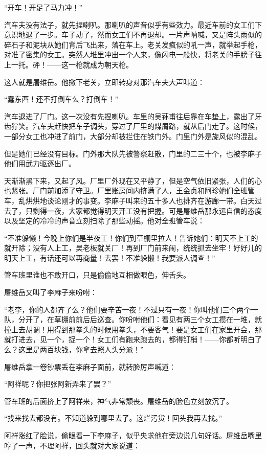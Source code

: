 \par “开车！开足了马力冲！”
\par 汽车夫没有法子，就先捏喇叭。那喇叭的声音似乎有些效力。最近车前的女工们下意识地退了一步。车子动了，然而女工们不再退却。一片声呐喊，又是阵头雨似的碎石子和泥块从她们背后飞出来，落在车上。老关发疯似的吼一声，就举起手枪，对准了密集的女工。突然人堆里冲出一个人来，像闪电一般快，将老关的手膀子往上一托。砰！——这一枪就成为朝天枪。
\par 这人就是屠维岳。他撇下老关，立即转身对那汽车夫大声叫道：
\par “蠢东西！还不打倒车么？打倒车！”
\par 汽车退进了厂门。这一次没有先捏喇叭。车里的吴荪甫往后靠在车垫上，露出了牙齿狞笑。汽车夫赶快把车子调头，穿过了厂里的煤屑路，就从后门走了。这时候，一部分女工也冲进了前门，大部分却被拦住在铁门外。门里门外是旋风似的混乱。
\par 但是她们已经没有目标。门外那大队先被警察赶散，门里的二三十个，也被李麻子他们用武力驱逐出厂。
\par 天渐渐黑下来，又起了风。厂里厂外现在又平静了，但是空气依旧紧张，人们的心也紧张。厂门前加添了守卫。厂里账房间内挤满了人，王金贞和阿珍她们全班管车，乱烘烘地谈论刚才的事变。李麻子叫来的五十多人也排齐在游廊一带。白天过去了，只剩得一夜，大家都觉得明天开工没有把握。可是屠维岳那永远自信的态度以及坚定的冷冷的声音立刻扫除了那些动摇。他对全班管车说：
\par “不准躲懒！今晚上你们是半夜工！你们到草棚里拉人！告诉她们：明天不上工的就开除；没有人上工，吴老板就关厂！再到厂门前来闹，统统抓去坐牢！好好儿的明天上工，有话还可以再商量！去罢！不准躲懒！我要派人调查！”
\par 管车班里谁也不敢开口，只是偷偷地互相做眼色，伸舌头。
\par 屠维岳又叫了李麻子来吩咐：
\par “老李，你的人都齐了么？他们要辛苦一夜！不过只有一夜！你叫他们三个两个一队，分开了，在草棚前前后后巡查。你吩咐他们：看见有两三个女工攒在一堆，就撞上去胡调！用得到那拳头的时候用拳头，不要客气！要是女工们在家里开会，那就打进去，见一个，捉一个！女工们有跑来跑去的，都得钉梢！——你都听明白了么？这里是两百块钱，你拿去照人头分派！”
\par 屠维岳拿一卷钞票丢在李麻子面前，就转脸厉声喊道：
\par “阿祥呢？你把张阿新弄来了罢？”
\par 管车班的后面挤上了阿祥来，神气非常颓丧。屠维岳的脸色立刻放沉了。
\par “找来找去都没有。不知道躲到哪里去了。这烂污货！回头我再去找。”
\par 阿祥涨红了脸说，偷眼看一下李麻子，似乎央求他在旁边说几句好话。屠维岳嘴里哼了一声，不理阿祥，回头就对大家说道：

